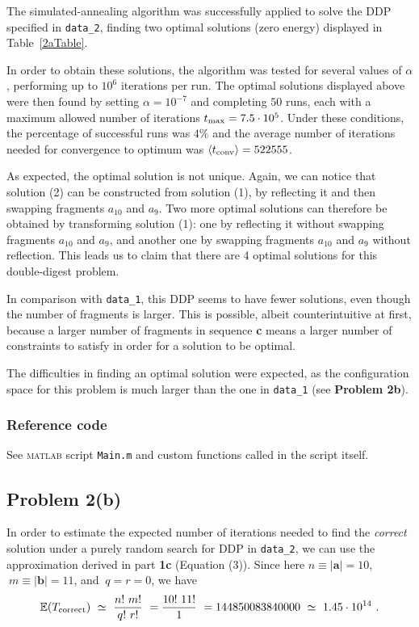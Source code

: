 \documentclass[12pt,A4,titlepage]{article}
\begin{document}
The simulated-annealing algorithm was successfully applied to solve the DDP specified in \texttt{data\_2}, finding two optimal solutions (zero energy) displayed in Table~\ref{2aTable}.

In order to obtain these solutions, the algorithm was tested for several values of $\alpha$, performing up to $10^6$ iterations per run. The optimal solutions displayed above were then found by setting $\alpha = 10^{-7}$ and completing $50$ runs, each with a maximum allowed number of iterations $t_{\textup{max}}=7.5\cdot10^5$. Under these conditions, the percentage of successful runs was $4\%$ and the average number of iterations needed for convergence to optimum was $\left<t_{\textup{conv}}\right> = 522555$.

As expected, the optimal solution is not unique. Again, we can notice that solution (2) can be constructed from solution (1), by reflecting it and then swapping fragments $a_{10}$ and $a_9$. Two more optimal solutions can therefore be obtained by transforming solution (1): one by reflecting it without swapping fragments $a_{10}$ and $a_9$, and another one by swapping fragments $a_{10}$ and $a_9$ without reflection. This leads us to claim that there are 4 optimal solutions for this double-digest problem.

In comparison with \texttt{data\_1}, this DDP seems to have fewer solutions, even though the number of fragments is larger. This is possible, albeit counterintuitive at first, because a larger number of fragments in sequence \textbf{c} means a larger number of constraints to satisfy in order for a solution to be optimal.

The difficulties in finding an optimal solution were expected, as the configuration space for this problem is much larger than the one in \texttt{data\_1} (see \textbf{Problem 2b}).

\vfill
\subsubsection*{Reference code}
See \textsc{matlab} script \verb!Main.m! and custom functions called in the script itself.

\clearpage
 
\subsection*{Problem 2(b)} 
 
In order to estimate the expected number of iterations needed to find the \emph{correct} solution under a purely random search for DDP in \texttt{data\_2}, we can use the approximation derived in part \textbf{1c} (Equation (3)). Since here $n \equiv \mid \bm{a} \mid = 10$, $\ m \equiv \mid \bm{b} \mid = 11$, and $\ q = r = 0$, we have
\[
\mathbb{E}(T_{\textup{correct}}) \ \simeq \ \dfrac{n! \ m!}{q! \ r!} \ = \dfrac{10! \ 11!}{1} \ = 144850083840000 \ \simeq \ 1.45 \cdot 10^{14} \ .
\]
\end{document}
